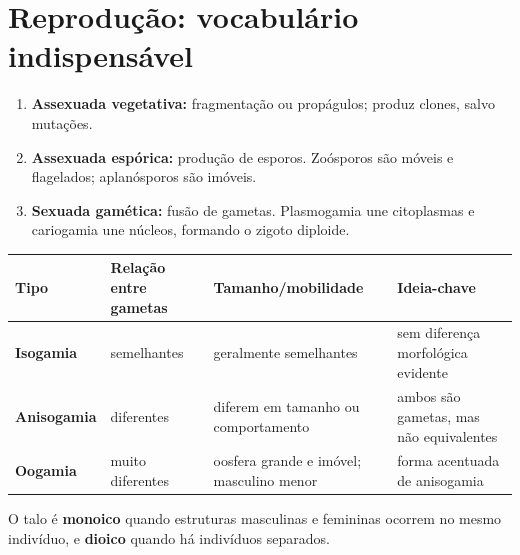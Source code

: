 \documentclass[12pt,a4paper]{article}
\begin{document}
\section{Reprodução: vocabulário indispensável}
\begin{enumerate}
\item \textbf{Assexuada vegetativa:} fragmentação ou propágulos; produz clones,
salvo mutações.
\item \textbf{Assexuada espórica:} produção de esporos. Zoósporos são móveis e
flagelados; aplanósporos são imóveis.
\item \textbf{Sexuada gamética:} fusão de gametas. Plasmogamia une citoplasmas e
cariogamia une núcleos, formando o zigoto diploide.
\end{enumerate}

\begin{center}
\begin{tabularx}{\textwidth}{>{\bfseries}lYYY}
\toprule
Tipo & Relação entre gametas & Tamanho/mobilidade & Ideia-chave\\
\midrule
Isogamia & semelhantes & geralmente semelhantes & sem diferença morfológica
evidente\\
Anisogamia & diferentes & diferem em tamanho ou comportamento & ambos são
gametas, mas não equivalentes\\
Oogamia & muito diferentes & oosfera grande e imóvel; masculino menor & forma
acentuada de anisogamia\\
\bottomrule
\end{tabularx}
\end{center}

O talo é \textbf{monoico} quando estruturas masculinas e femininas ocorrem no
mesmo indivíduo, e \textbf{dioico} quando há indivíduos separados.

\begin{center}
\end{center}
\end{document}
